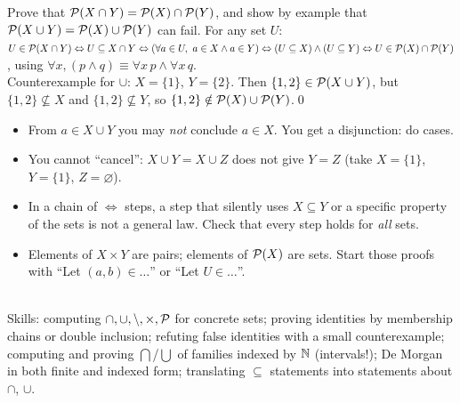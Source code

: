 \begin{hexample}
Prove that $\mathcal{P}(X\cap Y)=\mathcal{P}(X)\cap\mathcal{P}(Y)$, and show by example that $\mathcal{P}(X\cup Y)=\mathcal{P}(X)\cup\mathcal{P}(Y)$ can fail.
\solution
For any set $U$: $U\in\mathcal{P}(X\cap Y)\Leftrightarrow U\subseteq X\cap Y\Leftrightarrow(\forall a\in U,\ a\in X\wedge a\in Y)\Leftrightarrow(U\subseteq X)\wedge(U\subseteq Y)\Leftrightarrow U\in\mathcal{P}(X)\cap\mathcal{P}(Y)$, using $\forall x,(p\wedge q)\equiv\forall x\,p\wedge\forall x\,q$.\\
Counterexample for $\cup$: $X=\{1\}$, $Y=\{2\}$. Then $\{1,2\}\in\mathcal{P}(X\cup Y)$, but $\{1,2\}\not\subseteq X$ and $\{1,2\}\not\subseteq Y$, so $\{1,2\}\notin\mathcal{P}(X)\cup\mathcal{P}(Y)$.\qed
\end{hexample}

\begin{warn}
\begin{itemize}
\item From $a\in X\cup Y$ you may \emph{not} conclude $a\in X$. You get a disjunction: do cases.
\item You cannot ``cancel'': $X\cup Y=X\cup Z$ does not give $Y=Z$ (take $X=\{1\}$, $Y=\{1\}$, $Z=\varnothing$).
\item In a chain of $\Leftrightarrow$ steps, a step that silently uses $X\subseteq Y$ or a specific property of the sets is not a general law. Check that every step holds for \emph{all} sets.
\item Elements of $X\times Y$ are pairs; elements of $\mathcal{P}(X)$ are sets. Start those proofs with ``Let $(a,b)\in\dots$'' or ``Let $U\in\dots$''.
\end{itemize}
\end{warn}

\begin{planning}[2.2 and 2.E]
\quad {}\quad {}\\[3pt]
Skills: computing $\cap,\cup,\setminus,\times,\mathcal{P}$ for concrete sets; proving identities by membership chains or double inclusion; refuting false identities with a small counterexample; computing and proving $\bigcap$/$\bigcup$ of families indexed by $\mathbb{N}$ (intervals!); De Morgan in both finite and indexed form; translating $\subseteq$ statements into statements about $\cap$, $\cup$.
\end{planning}

